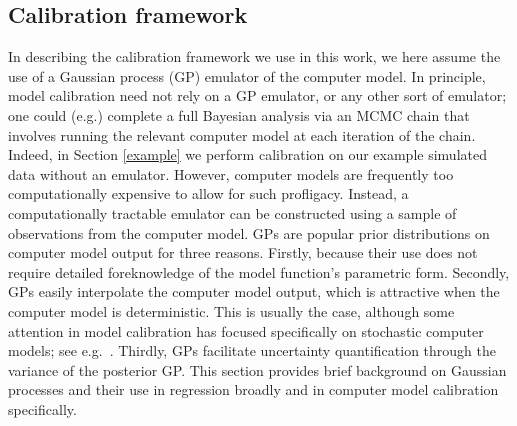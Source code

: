 \documentclass{article}
\begin{document}
\subsection{Calibration framework} \label{calib_framework}

In describing the calibration framework we use in this work, we here assume the use of a Gaussian process (GP) emulator of the computer model.
%
In principle, model calibration
need not rely on a GP emulator, or any other sort of emulator; one could (e.g.) complete a full Bayesian analysis via an MCMC chain that involves running the relevant computer model at each iteration of the chain. 
%
Indeed, in Section \ref{example} we perform calibration on our example simulated data without an emulator.
%
However, computer models are frequently too computationally expensive to allow for such profligacy.
%
Instead, a computationally tractable emulator can be constructed using a sample of observations from the computer model. 
%
GPs are popular prior distributions on computer model output for three reasons.
%
Firstly, because their use does not require detailed foreknowledge of the model function's parametric form. 
%
Secondly, GPs easily interpolate the computer model output, which is attractive when the computer model is deterministic. 
%
This is usually the case, although some attention in model calibration has focused specifically on stochastic computer models; see e.g.\ \cite{Pratola2018}. 
%
Thirdly, GPs facilitate uncertainty quantification through the variance of the posterior GP. 
%
This section provides brief background on Gaussian processes and their use in regression broadly and in computer model calibration specifically.

\end{document}
